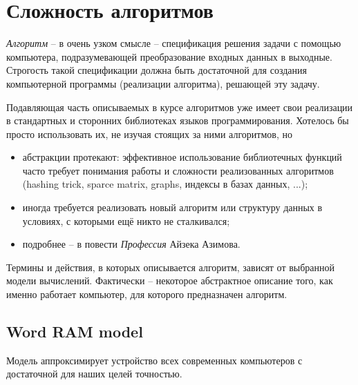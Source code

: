 \documentclass[12pt,a4paper]{report}
\begin{document}
\chapter*{Сложность алгоритмов}

{\em Алгоритм} -- в очень узком смысле -- спецификация решения задачи с помощью компьютера, подразумевающей преобразование входных данных в выходные. Строгость такой спецификации должна быть достаточной для создания компьютерной программы (реализации алгоритма), решающей эту задачу.

Подавляющая часть описываемых в курсе алгоритмов уже имеет свои реализации в стандартных и сторонних библиотеках языков программирования. Хотелось бы просто использовать их, не изучая стоящих за ними алгоритмов, но
\begin{itemize}
  \item абстракции протекают: эффективное использование библиотечных функций часто требует понимания работы и сложности реализованных алгоритмов (hashing trick, sparce matrix, graphs, индексы в базах данных, ...);
  \item иногда требуется реализовать новый алгоритм или структуру данных в условиях, с которыми ещё никто не сталкивался;
  \item подробнее -- в повести {\em Профессия} Айзека Азимова.
\end{itemize}

Термины и действия, в которых описывается алгоритм, зависят от выбранной модели вычислений.
Фактически -- некоторое абстрактное описание того, как именно работает компьютер, для которого предназначен алгоритм.


\section*{Word RAM model}

Модель аппроксимирует устройство всех современных компьютеров с достаточной для наших целей точностью.
\end{document}
